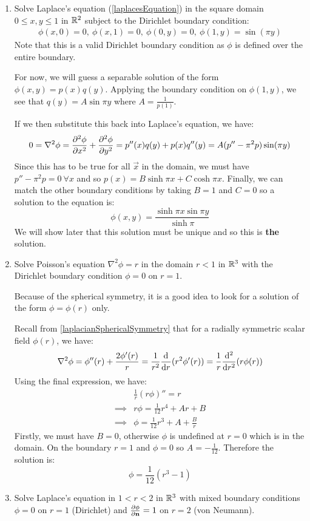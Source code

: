 \documentclass[../main.tex]{subfiles}
\begin{document}
\begin{example}
  \begin{enumerate}
    \item Solve Laplace's equation (\cref{laplacesEquation}) in the square domain $0 \leq x, y \leq 1$ in $\mathbb{R}^2$ subject to the Dirichlet boundary condition:
      \begin{align*}
        \phi(x, 0) = 0,\ \phi(x, 1) = 0,\ \phi(0, y) = 0,\ \phi(1, y) = \sin(\pi y)
      \end{align*}
      Note that this is a valid Dirichlet boundary condition as $\phi$ is defined over the entire boundary.

      For now, we will guess a separable solution of the form $\phi(x, y) = p(x)q(y)$.
      Applying the boundary condition on $\phi(1, y)$, we see that $q(y) = A \sin \pi y$ where $A = \frac{1}{p(1)}$.

      If we then substitute this back into Laplace's equation, we have:
      \[
        0 = \nabla^2 \phi = \pderiv[2]{\phi}{x} + \pderiv[2]{\phi}{y} = p''(x)q(y) + p(x)q''(y) = A(p'' - \pi^2 p)\sin(\pi y)
      \]
      Since this has to be true for all $\vec{x}$ in the domain, we must have $p'' - \pi^2p = 0\ \forall x$ and so $p(x) = B \sinh \pi x + C \cosh \pi x$.
      Finally, we can match the other boundary conditions by taking $B = 1$ and $C = 0$ so a solution to the equation is:
      \[
        \phi(x, y) = \frac{\sinh \pi x \sin \pi y}{\sinh \pi}
      \]
      We will show later that this solution must be unique and so this is \textbf{the} solution.
    \item Solve Poisson's equation $\nabla^2 \phi = r$ in the domain $r < 1$  in $\mathbb{R}^3$ with the Dirichlet boundary condition $\phi = 0$ on $r = 1$.

      Because of the spherical symmetry, it is a good idea to look for a solution of the form $\phi = \phi(r)$ only.

      Recall from \cref{laplacianSphericalSymmetry} that for a radially symmetric scalar field $\phi(r)$, we have:
      \[
        \nabla^2 \phi = \phi''(r) + \frac{2\phi'(r)}{r} = \frac{1}{r^2}\deriv{}{r}(r^2 \phi'(r)) = \frac{1}{r}\deriv[2]{}{r}(r\phi(r))
      \]
      Using the final expression, we have:
      \begin{align*}
        &\frac{1}{r}(r \phi)'' = r \\
        \implies& r \phi = \frac{1}{12}r^4 + Ar + B \\
        \implies& \phi = \frac{1}{12}r^3 + A + \frac{B}{r}
      \end{align*}
      Firstly, we must have $B = 0$, otherwise $\phi$ is undefined at $r = 0$ which is in the domain.
      On the boundary $r = 1$ and $\phi = 0$ so $A = -\frac{1}{12}$.
      Therefore the solution is:
      \[
        \phi = \frac{1}{12}(r^3 - 1)
      \]
    \item Solve Laplace's equation in $1 < r < 2$ in $\mathbb{R}^3$ with mixed boundary conditions $\phi = 0$ on $r = 1$ (Dirichlet) and $\pderiv{\phi}{\vec{n}} = 1$ on $r = 2$ (von Neumann).


\end{enumerate}
\end{example}
\end{document}
